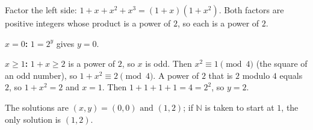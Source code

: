 Factor the left side: $1+x+x^2+x^3=(1+x)\left(1+x^2\right)$. Both factors are positive integers whose product is a power of $2$, so each is a power of $2$.

\textbf{$x=0$:} $1=2^y$ gives $y=0$.

\textbf{$x\ge1$:} $1+x\ge2$ is a power of $2$, so $x$ is odd. Then $x^2\equiv1\pmod4$ (the square of an odd number), so $1+x^2\equiv2\pmod4$. A power of $2$ that is $2$ modulo $4$ equals $2$, so $1+x^2=2$ and $x=1$. Then $1+1+1+1=4=2^2$, so $y=2$.

The solutions are $\boxed{(x,y)=(0,0)\text{ and }(1,2)}$; if $\mathbb N$ is taken to start at $1$, the only solution is $(1,2)$.
